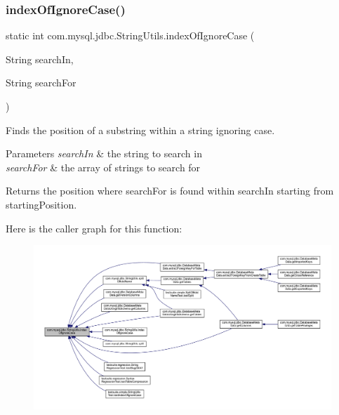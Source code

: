 \subsubsection{\texorpdfstring{index\+Of\+Ignore\+Case()}{indexOfIgnoreCase()}\hspace{0.1cm}{\footnotesize\ttfamily [1/5]}}
{\footnotesize\ttfamily static int com.\+mysql.\+jdbc.\+String\+Utils.\+index\+Of\+Ignore\+Case (\begin{DoxyParamCaption}\item[{String}]{search\+In,  }\item[{String}]{search\+For }\end{DoxyParamCaption})\hspace{0.3cm}{\ttfamily [static]}}

Finds the position of a substring within a string ignoring case.


\begin{DoxyParams}{Parameters}
{\em search\+In} & the string to search in \\
\hline
{\em search\+For} & the array of strings to search for \\
\hline
\end{DoxyParams}
\begin{DoxyReturn}{Returns}
the position where {\ttfamily search\+For} is found within {\ttfamily search\+In} starting from {\ttfamily starting\+Position}. 
\end{DoxyReturn}
Here is the caller graph for this function\+:
\nopagebreak
\begin{figure}[H]
\begin{center}
\leavevmode
\includegraphics[width=350pt]{classcom_1_1mysql_1_1jdbc_1_1_string_utils_a6d53939d6e9719bdac7d843213d387c8_icgraph}
\end{center}
\end{figure}
\mbox{\label{classcom_1_1mysql_1_1jdbc_1_1_string_utils_aa5b9bbcd397f4e878c473c861c14e739}} 
